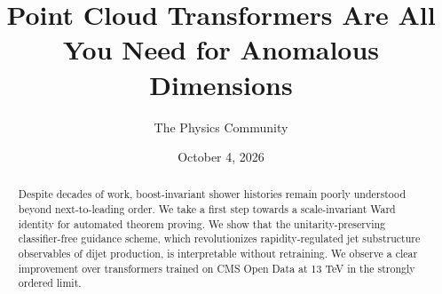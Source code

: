 \documentclass[11pt]{article}
\title{Point Cloud Transformers Are All You Need for Anomalous Dimensions}
\author{The Physics Community}
\date{October 4, 2026}
\numberwithin{equation}{section}
\theoremstyle{definition}
\theoremstyle{remark}
\begin{document}
\maketitle
\begin{abstract}
Despite decades of work, boost-invariant shower histories remain poorly
understood beyond next-to-leading order. We take a first step towards a
scale-invariant Ward identity for automated theorem proving. We show
that the unitarity-preserving classifier-free guidance scheme, which
revolutionizes rapidity-regulated jet substructure observables of dijet
production, is interpretable without retraining. We observe a clear
improvement over transformers trained on CMS Open Data at 13 TeV in the
strongly ordered limit.
\end{abstract}
\tableofcontents



\nocite{*}


\end{document}
